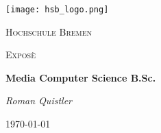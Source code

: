 \begin{titlepage}
	\centering
	\texttt{[image: hsb\_logo.png]}
	\par\vspace{1cm}
	{\scshape\LARGE Hochschule Bremen \par}
	\vspace{1cm}
	{\scshape\Large Exposè \par}
	\vspace{1.5cm}
	{\huge\bfseries Media Computer Science B.Sc. \par}
	\vspace{2cm}
	{\Large\itshape Roman Quistler \par}
	\vfill

	\vfill

	{\large \today\par}
\end{titlepage}
